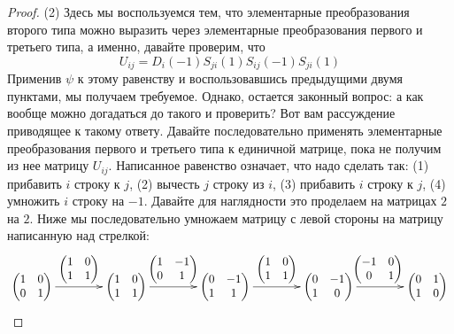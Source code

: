 \begin{proof}
(2) Здесь мы воспользуемся тем, что элементарные преобразования второго типа можно выразить через элементарные преобразования первого и третьего типа, а именно, давайте проверим, что 
\[
U_{ij} = D_i(-1)S_{ji}(1)S_{ij}(-1)S_{ji}(1)
\]
Применив $\psi$ к этому равенству и воспользовавшись предыдущими двумя пунктами, мы получаем требуемое. Однако, остается законный вопрос: а как вообще можно догадаться до такого и проверить? Вот вам рассуждение приводящее к такому ответу. Давайте последовательно применять элементарные преобразования первого и третьего типа к единичной матрице, пока не получим из нее матрицу $U_{ij}$. Написанное равенство означает, что надо сделать так: (1) прибавить $i$ строку к $j$, (2) вычесть $j$ строку из $i$, (3) прибавить $i$ строку к $j$, (4) умножить $i$ строку на $-1$. Давайте для наглядности это проделаем на матрицах $2$ на $2$. Ниже мы последовательно умножаем матрицу с левой стороны на матрицу написанную над стрелкой:
\[
\xymatrix@R=10pt@C=40pt{
 	{
 	\begin{pmatrix}
	{1}&{0}\\
	{0}&{1}\\
	\end{pmatrix}
	}\ar[r]^-{
	\begin{pmatrix}
	{1}&{0}\\{1}&{1}\\
	\end{pmatrix}
	}&{
 	\begin{pmatrix}
	{1}&{0}\\
	{1}&{1}\\
	\end{pmatrix}
	}\ar[r]^-{
 	\begin{pmatrix}
	{1}&{-1}\\
	{0}&{1}\\
	\end{pmatrix}
	}&{
 	\begin{pmatrix}
	{0}&{-1}\\
	{1}&{1}\\
	\end{pmatrix}
	}\ar[r]^{
 	\begin{pmatrix}
	{1}&{0}\\
	{1}&{1}\\
	\end{pmatrix}
	}&{
 	\begin{pmatrix}
	{0}&{-1}\\
	{1}&{0}\\
	\end{pmatrix}
	}\ar[r]^{
 	\begin{pmatrix}
	{-1}&{0}\\
	{0}&{1}\\
	\end{pmatrix}
	}&{
 	\begin{pmatrix}
	{0}&{1}\\
	{1}&{0}\\
	\end{pmatrix}
	}
}
\]
\end{proof}

